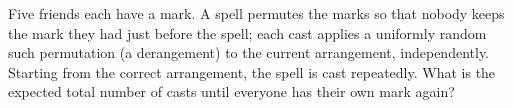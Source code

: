 Five friends each have a mark. A spell permutes the marks so that nobody keeps the mark they had just before the spell; each cast applies a uniformly random such permutation (a derangement) to the current arrangement, independently. Starting from the correct arrangement, the spell is cast repeatedly. What is the expected total number of casts until everyone has their own mark again?

